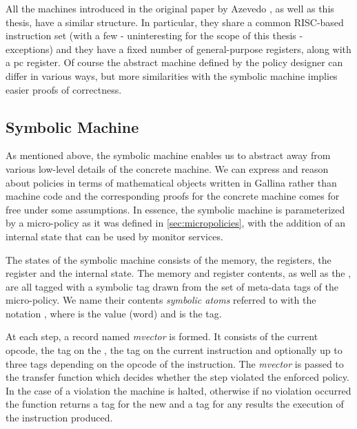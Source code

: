 All the machines introduced in the original paper by Azevedo \ETAL
\cite{popl2015}, as well as this thesis, have a similar
structure. In particular, they share a common RISC-based instruction
set (with a few - uninteresting for the scope of this thesis -
exceptions) and they have a fixed number of general-purpose registers,
along with a pc register. Of course the abstract machine defined by
the policy designer can differ in various ways, but more similarities
with the symbolic machine implies easier proofs of correctness.



\subsection{Symbolic Machine}\label{sec:symbolic}

As mentioned above, the symbolic machine enables us to abstract away from
various low-level details of the concrete machine. We can express and reason
about policies in terms of mathematical objects written in Gallina rather than
machine code and the corresponding proofs for the concrete machine comes for
free under some assumptions.
In essence, the symbolic machine is parameterized by a micro-policy as it was
defined in \ref{sec:micropolicies}, with the addition of an internal state
that can be used by monitor services.

The states of the symbolic machine consists of the memory, the
registers, the \pc register and the internal state. The memory and
register contents, as well as the \pc, are all tagged with a symbolic
tag drawn from the set of meta-data tags of the micro-policy. We name
their contents \textit{symbolic atoms} referred to with the notation
, where  is the value (word) and  is
the tag.

At each step, a record named \emph{mvector} is formed. It consists of
the current opcode, the tag on the \pc, the tag on the current
instruction and optionally up to three tags depending on the opcode of
the instruction. The \emph{mvector} is passed to the transfer function
which decides whether the step violated the enforced policy. In the
case of a violation the machine is halted, otherwise if no violation
occurred the \TRANSFER function returns a tag for the new \pc and a
tag for any results the execution of the instruction produced.

